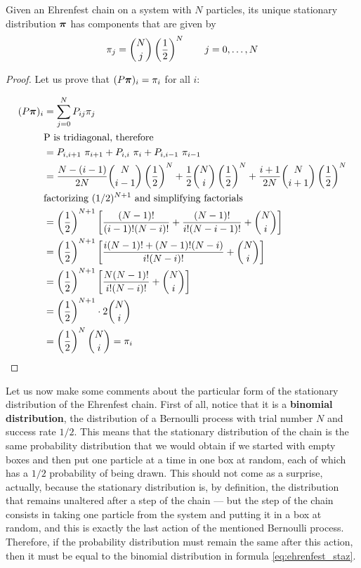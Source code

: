\begin{theorem}
    Given an Ehrenfest chain on a system with $N$ particles, its unique stationary distribution $\boldsymbol{\pi}$ has components that are given by
    \begin{equation} \label{eq:ehrenfest_staz}
        \pi_j = {{N} \choose {j}} \left(\frac{1}{2} \right)^{N} \quad \quad j = 0,\dots, N
    \end{equation}
\end{theorem}
\begin{proof}
    Let us prove that $(P \boldsymbol{\pi})_i =\pi_i$ for all $i$:

        \begin{align}
            (P \boldsymbol{\pi})_i 
            & =  \sum_{j = 0}^N P_{ij} \pi_j \\
            & \text{P is tridiagonal, therefore} \\ 
            & = P_{i,i+1}~\pi_{i+1} + P_{i,i}~\pi_i + P_{i,i-1}~\pi_{i-1}\\
            & = \frac{N-(i-1)}{2N} {{N} \choose {i-1}} \left(\frac{1}{2} \right)^{N} + \frac{1}{2} {{N} \choose {i}} \left(\frac{1}{2} \right)^{N} + \frac{i+1}{2N} {{N} \choose {i+1}} \left(\frac{1}{2} \right)^{N} \\
            & \text{factorizing $(1/2)^{N+1}$ and simplifying factorials} \\
            & = \left(\frac{1}{2} \right)^{N+1} \left[ \frac{(N-1)!}{(i-1)! (N-i)!} + \frac{(N-1)!}{i! (N-i-1)!} + {{N} \choose {i}} \right]\\
            & = \left(\frac{1}{2} \right)^{N+1} \left[ \frac{i (N-1)! + (N-1)! (N-i)}{i! (N-i)!} + {{N} \choose {i}} \right] \\
            & = \left(\frac{1}{2} \right)^{N+1} \left[ \frac{N (N-1)!}{i! (N-i)!} + {{N} \choose {i}} \right] \\
            & = \left(\frac{1}{2} \right)^{N+1} \cdot 2 {{N} \choose {i}}\\
            & = \left(\frac{1}{2} \right)^{N} {{N} \choose {i}} = \pi_i 
        \end{align}
\end{proof}


Let us now make some comments about the particular form of the stationary distribution of the Ehrenfest chain. First of all, notice that it is a \textbf{binomial distribution}, \ie the distribution of a Bernoulli process with trial number $N$ and success rate $1/2$. This means that the stationary distribution of the chain is the same probability distribution that we would obtain if we started with empty boxes and then put one particle at a time in one box at random, each of which has a $1/2$ probability of being drawn. This should not come as a surprise, actually, because the stationary distribution is, by definition, the distribution that remains unaltered after a step of the chain --- but the step of the chain consists in taking one particle from the system and putting it in a box at random, and this is exactly the last action of the mentioned Bernoulli process. Therefore, if the probability distribution must remain the same after this action, then it must be equal to the binomial distribution in formula \ref{eq:ehrenfest_staz}.

